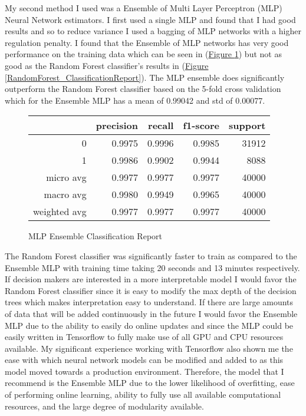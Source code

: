 \documentclass[12pt]{article}
\begin{document}
My second method I used was a Ensemble of Multi Layer Perceptron (MLP) Neural Network estimators. I first used a single MLP and found that I had good results and so to reduce variance I used a bagging of MLP networks with a higher regulation penalty. I found that the Ensemble of MLP networks has very good performance on the training data which can be seen in (\hyperref[MLPEnsemble_ClassificationReport]{Figure \ref{MLPEnsemble_ClassificationReport}}) but not as good as the Random Forest classifier's results in (\hyperref[RandomForest_ClassificationReport]{Figure \ref{RandomForest_ClassificationReport}}). The MLP ensemble does significantly outperform the Random Forest classifier based on the 5-fold cross validation which for the Ensemble MLP has a mean of 0.99042 and std of 0.00077.

\begin{figure}[H]
  \centering
  \begin{tabular}{r|r|r|r|r}
  & precision  & recall & f1-score & support \\
  \hline
  0             &0.9975 &0.9996 &0.9985     &31912\\
  1             &0.9986 &0.9902 &0.9944     &8088\\
  micro avg     &0.9977 &0.9977 &0.9977     &40000\\
  macro avg     &0.9980 &0.9949 &0.9965     &40000\\
  weighted avg  &0.9977 &0.9977 &0.9977     &40000
  \end{tabular}
  \caption{MLP Ensemble Classification Report}
  \label{MLPEnsemble_ClassificationReport}
\end{figure}

The Random Forest classifier was significantly faster to train as compared to the Ensemble MLP with training time taking 20 seconds and 13 minutes respectively. If decision makers are interested in a more interpretable model I would favor the Random Forest classifier since it is easy to modify the max depth of the decision trees which makes interpretation easy to understand. If there are large amounts of data that will be added continuously in the future I would favor the Ensemble MLP due to the ability to easily do online updates and since the MLP could be easily written in Tensorflow to fully make use of all GPU and CPU resources available. My significant experience working with Tensorflow also shown me the ease with which neural network models can be modified and added to as this model moved towards a production environment. Therefore, the model that I recommend is the Ensemble MLP due to the lower likelihood of overfitting, ease of performing online learning, ability to fully use all available computational resources, and the large degree of modularity available.
\end{document}
